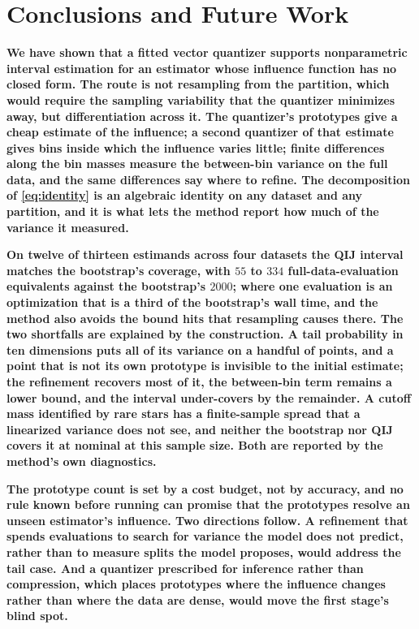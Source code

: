 \documentclass[runningheads]{llncs}
\newif\ifrev \revtrue
\newcommand{\rev}[1]{\ifrev{\color{blue}\bfseries #1}\else#1\fi}
\begin{document}
\section{Conclusions and Future Work}\label{sec:conclusions}

\rev{We have shown that a fitted vector quantizer supports nonparametric interval estimation for an estimator whose influence function has no closed form. The route is not resampling from the partition, which would require the sampling variability that the quantizer minimizes away, but differentiation across it. The quantizer's prototypes give a cheap estimate of the influence; a second quantizer of that estimate gives bins inside which the influence varies little; finite differences along the bin masses measure the between-bin variance on the full data, and the same differences say where to refine. The decomposition of \eqref{eq:identity} is an algebraic identity on any dataset and any partition, and it is what lets the method report how much of the variance it measured.}

\rev{On twelve of thirteen estimands across four datasets the QIJ interval matches the bootstrap's coverage, with $55$ to $334$ full-data-evaluation equivalents against the bootstrap's $2000$; where one evaluation is an optimization that is a third of the bootstrap's wall time, and the method also avoids the bound hits that resampling causes there. The two shortfalls are explained by the construction. A tail probability in ten dimensions puts all of its variance on a handful of points, and a point that is not its own prototype is invisible to the initial estimate; the refinement recovers most of it, the between-bin term remains a lower bound, and the interval under-covers by the remainder. A cutoff mass identified by rare stars has a finite-sample spread that a linearized variance does not see, and neither the bootstrap nor QIJ covers it at nominal at this sample size. Both are reported by the method's own diagnostics.}

\rev{The prototype count is set by a cost budget, not by accuracy, and no rule known before running can promise that the prototypes resolve an unseen estimator's influence. Two directions follow. A refinement that spends evaluations to search for variance the model does not predict, rather than to measure splits the model proposes, would address the tail case. And a quantizer prescribed for inference rather than compression, which places prototypes where the influence changes rather than where the data are dense, would move the first stage's blind spot.}
\end{document}
